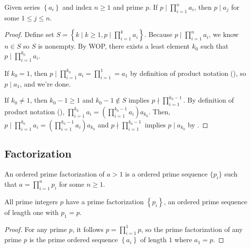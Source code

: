 \begin{theorem}\label{extended-euclid}
    Given series $\left\{a_i\right\}$ and index $n\geq 1$ and prime $p$. If $p\mid \prod_{i=1}^n a_i$, then $p\mid a_j$ for some $1\leq j\leq n$. 
\end{theorem}
\begin{proof}
    Define set $S=\left\{k \mid k\geq1, p\mid \prod_{i=1}^k a_i \right\}$. Because $p\mid \prod_{i=1}^n a_i$, we know $n\in S$ so $S$ is nonempty. By WOP, there exists a least element $k_0$ such that $p\mid \prod_{i=1}^{k_0} a_i$. 
    
    If $k_0=1$, then $p\mid\prod_{i=1}^{k_0} a_i=\prod_{i=1}^1=a_1$ by definition of product notation (), so $p\mid a_1$, and we're done. 

    If $k_0\neq 1$, then $k_0-1\geq1$ and $k_0-1\notin S$ implies $p\nmid \prod_{i=1}^{k_0-1}$. By definition of product notation (), $\prod_{i=1}^{k_0} a_i=(\prod_{i=1}^{k_0-1} a_i) a_{k_0}$. Then, $p\mid \prod_{i=1}^{k_0} a_i=(\prod_{i=1}^{k_0-1} a_i) a_{k_0}$ and $p\nmid \prod_{i=1}^{k_0-1}$ implies $p\mid a_{k_0}$ by .
\end{proof}

\subsection{Factorization}

\begin{definition}
    An ordered prime factorization of $a>1$ is a ordered prime sequence $\{ p_i \}$ such that $a=\prod_{i=1}^n p_i$ for some $n\geq 1$.
\end{definition}

\begin{lemma}\label{prime_factorization_exist_prime}
    All prime integers $p$ have a prime factorization $\left\{p_i\right\}$, an ordered prime sequence of length one with $p_1=p$.
\end{lemma}
\begin{proof}
    For any prime $p$, it follows $p=\prod_{i=1}^1 p$, so the prime factorization of any prime $p$ is the prime ordered sequence $\left\{a_i\right\}$ of length $1$ where $a_1=p$.
\end{proof}

